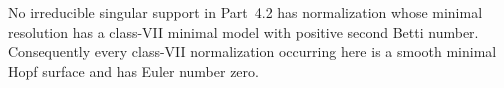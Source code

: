 
\begin{proposition}[P4.37]\hypertarget{tag-02XA}{}\label{night:P4.37}\label{stmt:P4.37}


No irreducible singular support in Part~4.2 has normalization
whose minimal resolution has a class-VII minimal model with
positive second Betti number. Consequently every class-VII
normalization occurring here is a smooth minimal Hopf surface
and has Euler number zero.
\end{proposition}

